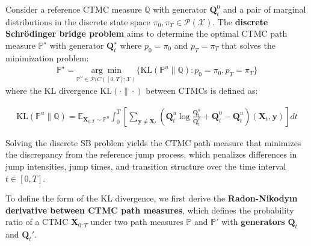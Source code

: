 \documentclass{article}
\newcommand{\boldtext}[1]{\textbf{\textcolor{MyGreen}{#1}}}
\begin{document}
\begin{definition}\label{def:discrete-sbp}
    Consider a reference CTMC measure $\mathbb{Q}$ with generator $\boldsymbol{Q}^0_t$ and a pair of marginal distributions in the discrete state space $\pi_0, \pi_T\in \mathcal{P}(\mathcal{X})$. The \textbf{discrete Schrödinger bridge problem} aims to determine the optimal CTMC path measure $\mathbb{P}^\star$ with generator $\boldsymbol{Q}^\star_t$ where $p_0=\pi_0$ and $p_T=\pi_T$ that solves the minimization problem: 
    \begin{align}
        \mathbb{P}^\star=\underset{\mathbb{P}^u\in \mathcal{P}(C([0,T];\mathcal{X})}{\arg\min}\big\{\text{KL}(\mathbb{P}^u\|\mathbb{Q}):p_0=\pi_0, p_T=\pi_T\big\}\tag{Discrete SB Problem}\label{eq:discrete-sb-problem}
    \end{align}
    where the KL divergence $\text{KL}(\cdot\|\cdot)$ between CTMCs is defined as: \begin{small}
    \begin{align}
    \text{KL}(\mathbb{P}^u\|\mathbb{Q})=\mathbb{E}_{\boldsymbol{X}_{0:T}\sim \mathbb{P}^u}\int_0^T\left[\sum_{\boldsymbol{y}\neq \boldsymbol{X}_t}\left(\boldsymbol{Q}_t^u\log \frac{\boldsymbol{Q}^u_t}{\boldsymbol{Q}^0_t}+\boldsymbol{Q}^0_t-\boldsymbol{Q}^u_t\right)(\boldsymbol{X}_t,\boldsymbol{y})\right]dt
    \end{align}
    \end{small}
\end{definition}

Solving the discrete SB problem yields the CTMC path measure that minimizes the discrepancy from the reference jump process, which penalizes differences in jump intensities, jump times, and transition structure over the time interval $t\in [0,T]$.

To define the form of the KL divergence, we first derive the \boldtext{Radon-Nikodym derivative between CTMC path measures}, which defines the probability ratio of a CTMC $\boldsymbol{X}_{0:T}$ under two path measures $\mathbb{P}$ and $\mathbb{P}'$ with \textbf{generators} $\boldsymbol{Q}_t$ and $\boldsymbol{Q}_t'$. 
\end{document}
